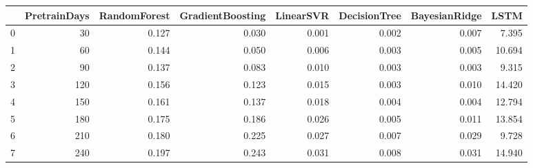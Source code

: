 \begin{tabular}{lrrrrrrr}
\toprule
{} &  PretrainDays &  RandomForest &  GradientBoosting &  LinearSVR &  DecisionTree &  BayesianRidge &   LSTM \\
\midrule
0 &            30 &         0.127 &             0.030 &      0.001 &         0.002 &          0.007 &  7.395 \\
1 &            60 &         0.144 &             0.050 &      0.006 &         0.003 &          0.005 & 10.694 \\
2 &            90 &         0.137 &             0.083 &      0.010 &         0.003 &          0.003 &  9.315 \\
3 &           120 &         0.156 &             0.123 &      0.015 &         0.003 &          0.010 & 14.420 \\
4 &           150 &         0.161 &             0.137 &      0.018 &         0.004 &          0.004 & 12.794 \\
5 &           180 &         0.175 &             0.186 &      0.026 &         0.005 &          0.011 & 13.854 \\
6 &           210 &         0.180 &             0.225 &      0.027 &         0.007 &          0.029 &  9.728 \\
7 &           240 &         0.197 &             0.243 &      0.031 &         0.008 &          0.031 & 14.940 \\
\bottomrule
\end{tabular}
